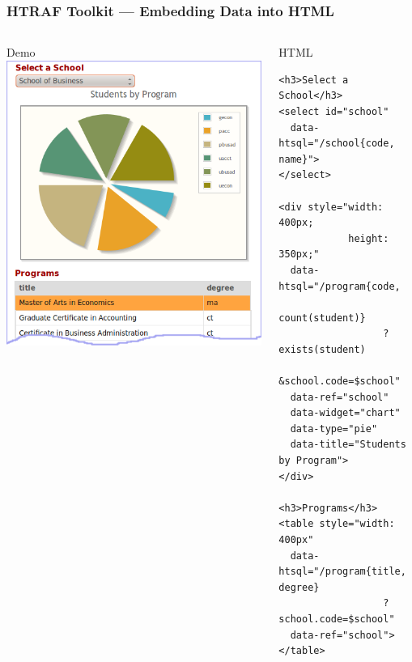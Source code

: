 \documentclass{beamer}
\begin{document}
\begin{frame}[containsverbatim]
\frametitle{HTRAF Toolkit --- Embedding Data into HTML}
\begin{columns}[c]
\begin{column}[T]{.5\textwidth}
\begin{block}{Demo}
\includegraphics[width=\textwidth]{img/htraf-1.png}
\end{block}
\end{column}
\begin{column}[T]{.5\textwidth}
\begin{block}{HTML}
\tiny
\begin{lstlisting}
<h3>Select a School</h3>
<select id="school"
  data-htsql="/school{code, name}">
</select>

<div style="width: 400px;
            height: 350px;"
  data-htsql="/program{code,
                       count(student)}
                  ?exists(student)
                  &school.code=$school"
  data-ref="school"
  data-widget="chart"
  data-type="pie"
  data-title="Students by Program">
</div>

<h3>Programs</h3>
<table style="width: 400px"
  data-htsql="/program{title, degree}
                  ?school.code=$school"
  data-ref="school">
</table>
\end{lstlisting}
\end{block}
\end{column}
\end{columns}
\end{frame}
\end{document}
